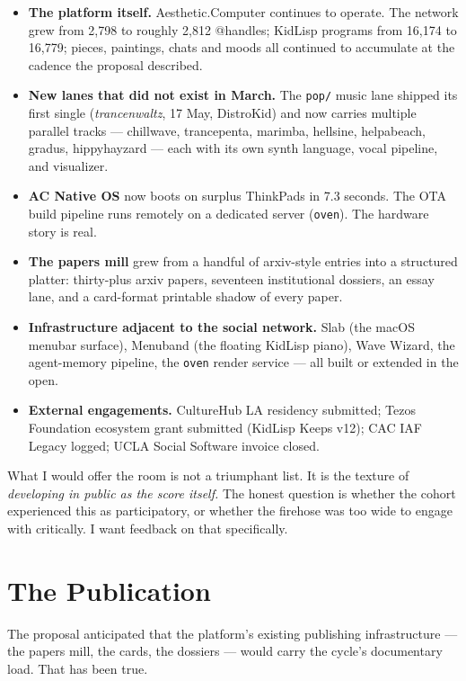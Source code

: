 \documentclass[11pt,letterpaper]{article}
\newcommand{\ac}{Aesthetic\textcolor{acpink}{.}Computer}
\newcommand{\acos}{AC Native OS}
\begin{document}
\begin{itemize}
  \item \textbf{The platform itself.} \ac{} continues to operate. The network grew from 2,798 to roughly 2,812 @handles; KidLisp programs from 16,174 to 16,779; pieces, paintings, chats and moods all continued to accumulate at the cadence the proposal described.
  \item \textbf{New lanes that did not exist in March.} The \texttt{pop/} music lane shipped its first single (\textit{trancenwaltz}, 17 May, DistroKid) and now carries multiple parallel tracks --- chillwave, trancepenta, marimba, hellsine, helpabeach, gradus, hippyhayzard --- each with its own synth language, vocal pipeline, and visualizer.
  \item \textbf{\acos{}} now boots on surplus ThinkPads in 7.3 seconds. The OTA build pipeline runs remotely on a dedicated server (\texttt{oven}). The hardware story is real.
  \item \textbf{The papers mill} grew from a handful of arxiv-style entries into a structured platter: thirty-plus arxiv papers, seventeen institutional dossiers, an essay lane, and a card-format printable shadow of every paper.
  \item \textbf{Infrastructure adjacent to the social network.} Slab (the macOS menubar surface), Menuband (the floating KidLisp piano), Wave Wizard, the agent-memory pipeline, the \texttt{oven} render service --- all built or extended in the open.
  \item \textbf{External engagements.} CultureHub LA residency submitted; Tezos Foundation ecosystem grant submitted (KidLisp Keeps v12); CAC IAF Legacy logged; UCLA Social Software invoice closed.
\end{itemize}

What I would offer the room is not a triumphant list. It is the texture of \emph{developing in public as the score itself.} The honest question is whether the cohort experienced this as participatory, or whether the firehose was too wide to engage with critically. I want feedback on that specifically.

\section{The Publication}

The proposal anticipated that the platform's existing publishing infrastructure --- the papers mill, the cards, the dossiers --- would carry the cycle's documentary load. That has been true.
\end{document}
